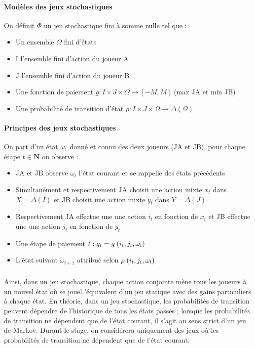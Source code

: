 \documentclass[a4paper, 12pt, twoside]{article}
\begin{document}
{{\paragraph{Modèles des jeux stochastiques}
On définit $\Phi$ un jeu stochastique fini à somme nulle tel que :
\begin{itemize}
\item Un ensemble $\Omega$ fini d'états
\item I l'ensemble fini d'action du joueur A
\item J l'ensemble fini d'action du joueur B
\item Une fonction de paiement $g : I \times J \times\Omega\rightarrow [ -M,M]$ (max JA et min JB)
\item Une probabilité de transition d'état $\rho : I \times J \times \Omega \rightarrow \Delta (\Omega)$
\end{itemize}

\paragraph{Principes des jeux stochastiques}
On part d'un état $\omega_{1}$ donné et connu des deux joueurs (JA et JB), pour chaque étape $t \in \mathbf{N}$ on observe :
\begin{itemize}
\item JA et JB observe $\omega_{t}$ l'état courant et se rappelle des états précédents
\item Simultanément et respectivement JA choisit une action mixte $x_{t}$ dans $X = \Delta (I)$ et JB choisit une action mixte $y_{t}$ dans $Y = \Delta (J)$ 
\item Respectivement JA effectue une une action $i_{t} $ en fonction de $x_{t}$ et JB effectue une une action $j_{t} $ en fonction de $y_{t}$
\item Une étape de paiement $t : g_{t} = g\hspace{0,1 cm} (i_{t},j_{t},\omega_{t})$ 
\item L'état suivant $\omega_{t+1}$ attribué selon $\rho \hspace{0,1 cm} (i_{t},j_{t},\omega_{t})$ 
\end{itemize}
\subparagraph*{}{Ainsi, dans un jeu stochastique, chaque action conjointe mène tous les joueurs à un nouvel état où se jouel ’équivalent d’un jeu statique avec des gains particuliers à chaque état. En théorie, dans un jeu stochastique, les probabilités de transition peuvent dépendre de l’historique de tous les états passés ; lorsque les probabilités de transition ne dépendent que de l’état courant, il s’agit au sens strict d’un jeu de Markov. Durant le stage, on considérera uniquement des jeux où les probabilités de transition ne dépendent que de l’état courant.}

}}
\end{document}
